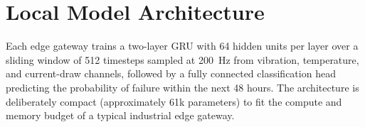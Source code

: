 \section{Local Model Architecture}
Each edge gateway trains a two-layer GRU with 64 hidden units per layer over a sliding
window of 512 timesteps sampled at 200~Hz from vibration, temperature, and current-draw
channels, followed by a fully connected classification head predicting the probability
of failure within the next 48 hours. The architecture is deliberately compact
(approximately 61k parameters) to fit the compute and memory budget of a typical
industrial edge gateway.
